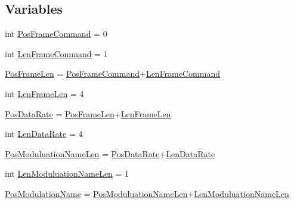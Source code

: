 \subsection*{Variables}
\begin{DoxyCompactItemize}
\item 
int \hyperlink{namespace_tlmy_cmd_processor_1_1_tlmy_cmd_processor_a88e5624ffdbb481998f56fc73359de9a}{Pos\+Frame\+Command} = 0
\item 
int \hyperlink{namespace_tlmy_cmd_processor_1_1_tlmy_cmd_processor_a64ebb9875c3f0f30fd7cd3b962d812f3}{Len\+Frame\+Command} = 1
\item 
\hyperlink{namespace_tlmy_cmd_processor_1_1_tlmy_cmd_processor_a8d0363eccf14b5a5864f22854a033bc6}{Pos\+Frame\+Len} = \hyperlink{namespace_tlmy_cmd_processor_1_1_tlmy_cmd_processor_a88e5624ffdbb481998f56fc73359de9a}{Pos\+Frame\+Command}+\hyperlink{namespace_tlmy_cmd_processor_1_1_tlmy_cmd_processor_a64ebb9875c3f0f30fd7cd3b962d812f3}{Len\+Frame\+Command}
\item 
int \hyperlink{namespace_tlmy_cmd_processor_1_1_tlmy_cmd_processor_a4258f8620fd2045719a2170f64913b1f}{Len\+Frame\+Len} = 4
\item 
\hyperlink{namespace_tlmy_cmd_processor_1_1_tlmy_cmd_processor_a76d473c0c6d81f0ebbf3de7c2e66e65c}{Pos\+Data\+Rate} = \hyperlink{namespace_tlmy_cmd_processor_1_1_tlmy_cmd_processor_a8d0363eccf14b5a5864f22854a033bc6}{Pos\+Frame\+Len}+\hyperlink{namespace_tlmy_cmd_processor_1_1_tlmy_cmd_processor_a4258f8620fd2045719a2170f64913b1f}{Len\+Frame\+Len}
\item 
int \hyperlink{namespace_tlmy_cmd_processor_1_1_tlmy_cmd_processor_ad594ffcbc7ad47494749f33e26f93c2b}{Len\+Data\+Rate} = 4
\item 
\hyperlink{namespace_tlmy_cmd_processor_1_1_tlmy_cmd_processor_a842d2ed3cb03a36110727a626772cd3c}{Pos\+Moduluation\+Name\+Len} = \hyperlink{namespace_tlmy_cmd_processor_1_1_tlmy_cmd_processor_a76d473c0c6d81f0ebbf3de7c2e66e65c}{Pos\+Data\+Rate}+\hyperlink{namespace_tlmy_cmd_processor_1_1_tlmy_cmd_processor_ad594ffcbc7ad47494749f33e26f93c2b}{Len\+Data\+Rate}
\item 
int \hyperlink{namespace_tlmy_cmd_processor_1_1_tlmy_cmd_processor_a251db0b074d036dc2764b58c8b186a94}{Len\+Moduluation\+Name\+Len} = 1
\item 
\hyperlink{namespace_tlmy_cmd_processor_1_1_tlmy_cmd_processor_ac1137c905bca1594a8a5691668001c00}{Pos\+Modulation\+Name} = \hyperlink{namespace_tlmy_cmd_processor_1_1_tlmy_cmd_processor_a842d2ed3cb03a36110727a626772cd3c}{Pos\+Moduluation\+Name\+Len}+\hyperlink{namespace_tlmy_cmd_processor_1_1_tlmy_cmd_processor_a251db0b074d036dc2764b58c8b186a94}{Len\+Moduluation\+Name\+Len}

\end{DoxyCompactItemize}
